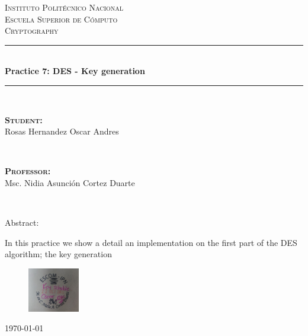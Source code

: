 \documentclass[fleqn, journal, onecolumn]{IEEEtran}             %
\author{Oscar Andrés Rosas}                                     %
\theoremstyle{break}                                            %
\begin{document}
  \begin{titlepage}

    \center
    \textsc{\Large Instituto Politécnico Nacional \\ Escuela Superior de Cómputo}\\[0.5cm] 
    \textsc{\large Cryptography}\\[1.5cm]

    \rule{\linewidth}{0.5mm} \\[1.0cm]
        { \huge \bfseries Practice 7: DES - Key generation}\\[1.0cm] 
    \rule{\linewidth}{0.5mm} \\[2.0cm]
    
    \begin{minipage}{0.4\textwidth}
        \begin{flushleft} \large
            \textbf{\textsc{Student:}}\\
            Rosas Hernandez Oscar Andres
        \end{flushleft}
    \end{minipage}
    ~
    \begin{minipage}{0.4\textwidth}
        \begin{flushright} \large
            \textbf{\textsc{Professor: }}\\
            Msc. Nidia Asunción Cortez Duarte
        \end{flushright}
    \end{minipage}\\[3,5cm]

    {\large
      Abstract:
      
      In this practice we show a detail an implementation on the first part of 
      the DES algorithm; the key generation
      \\[2cm]
    }
    

    \begin{figure}[h]
      \centering
      \includegraphics[width=0.20\textwidth]{Sello}
    \end{figure}


    {\large \today}\\[2cm] 

    \vfill

  \end{titlepage}
\end{document}
